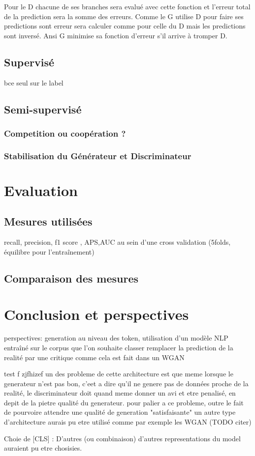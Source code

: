 \documentclass[francais,a4paper]{llncs} %
\begin{document}
	Pour le D chacune de ses branches sera evalué avec cette fonction et l'erreur total de la prediction sera la somme des erreurs.
	Comme le G utilise D pour faire ses predictions sont erreur sera calculer comme pour celle du D mais les predictions sont inversé. Ansi G minimise sa fonction d'erreur s'il arrive à tromper D.

	\subsection{Supervisé}

		bce seul sur le label

	\subsection{Semi-supervisé}
		\subsubsection{Competition ou coopération ?}
		\subsubsection{Stabilisation du Générateur et Discriminateur}
\section{Evaluation}
\subsection{Mesures utilisées}
recall, precision, f1 score , APS,AUC
au sein d'une cross validation (5folds, équilibre pour l'entraînement)

\subsection{Comparaison des mesures}
	
\section{Conclusion et perspectives}
perspectives:
generation au niveau des token, utilisation d'un modèle NLP entraîné sur le corpus que l'on souhaite classer 
remplacer la prediction de la realité par une critique comme cela est fait dans un WGAN

test f zjfhizef 
un des probleme de cette architecture est que meme lorsque le generateur n'est pas bon, c'eet a dire qu'il ne genere pas de données proche de la realité, le discriminateur doit quand meme donner un avi et etre penalisé, en depit de la pietre qualité du generateur. pour palier a ce probleme, outre le fait de pourvoire attendre une qualité de generation "satisfaisante" un autre type d'architecture aurais pu etre utilisé comme par exemple les WGAN (TODO citer)

Choie de [CLS] : D'autres (ou combinaison) d'autres representations du model auraient pu etre chosisies.
\end{document}
